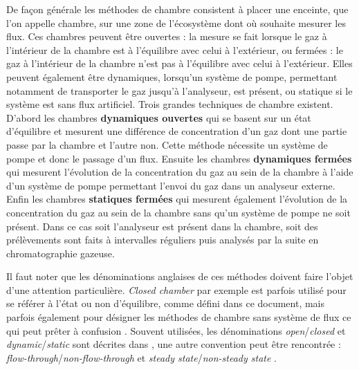 De façon générale les méthodes de chambre consistent à placer une enceinte, que l'on appelle chambre, sur une zone de l'écosystème dont où souhaite mesurer les flux.
Ces chambres peuvent être ouvertes : la mesure se fait lorsque le gaz à l'intérieur de la chambre est à l'équilibre avec celui à l'extérieur, ou fermées : le gaz à l'intérieur de la chambre n'est pas à l'équilibre avec celui à l'extérieur.
Elles peuvent également être dynamiques, lorsqu'un système de pompe, permettant notamment de transporter le gaz jusqu'à l'analyseur, est présent, ou statique si le système est sans flux artificiel.
Trois grandes techniques de chambre existent.
D'abord les chambres \textbf{dynamiques ouvertes} qui se basent sur un état d'équilibre et mesurent une différence de concentration d'un gaz dont une partie passe par la chambre et l'autre non. 
Cette méthode nécessite un système de pompe et donc le passage d'un flux.
Ensuite les chambres \textbf{dynamiques fermées} qui mesurent l'évolution de la concentration du gaz au sein de la chambre à l'aide d'un système de pompe permettant l'envoi du gaz dans un analyseur externe.
Enfin les chambres \textbf{statiques fermées} qui mesurent également l'évolution de la concentration du gaz au sein de la chambre sans qu'un système de pompe ne soit présent.
Dans ce cas soit l'analyseur est présent dans la chambre, soit des prélèvements sont faits à intervalles réguliers puis analysés par la suite en chromatographie gazeuse.

Il faut noter que les dénominations anglaises de ces méthodes doivent faire l'objet d'une attention particulière.
\textit{Closed chamber} par exemple est parfois utilisé pour se référer à l'état ou non d'équilibre, comme défini dans ce document, mais parfois également pour désigner les méthodes de chambre sans système de flux ce qui peut prêter à confusion \citep{pumpanen2004}.
Souvent utilisées, les dénominations \textit{open}/\textit{closed} et \textit{dynamic}/\textit{static} sont décrites dans \citep{luo2006161}, une autre convention peut être rencontrée : \textit{flow-through}/\textit{non-flow-through} et \textit{steady state}/\textit{non-steady state} \citep{livingston1995}.

